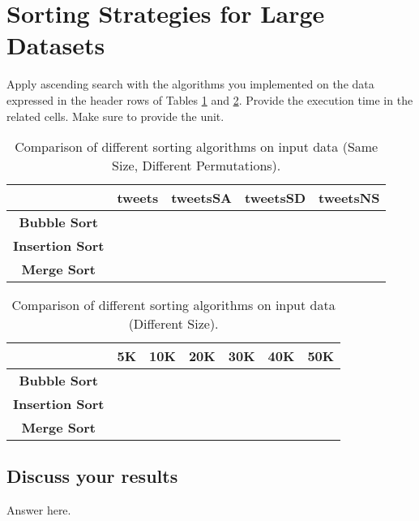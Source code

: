 \label{implementation}

\section{Sorting Strategies for Large Datasets}

Apply ascending search with the algorithms you implemented on the data expressed in the header rows of Tables \ref{dataPermutation} and \ref{dataSize}. Provide the execution time in the related cells. Make sure to provide the unit. 

\begin{table}[h!]
\centering
\begin{tabular}{|c|c|c|c|c|}
\hline
                        & \textbf{tweets} & \textbf{tweetsSA} & \textbf{tweetsSD} & \textbf{tweetsNS} \\ \hline
\textbf{Bubble Sort}   &                    & & &                    \\ \hline

\textbf{Insertion Sort}   &                    & & &                    \\ \hline
\textbf{Merge Sort}   &                    & & &                    \\ \hline

\end{tabular}
\caption{Comparison of different sorting algorithms on input data (Same Size, Different Permutations). }
\label{dataPermutation}
\end{table}

\begin{table}[h!]
\centering
\begin{tabular}{|c|c|c|c|c|c|c|}
\hline
                        & \textbf{5K} & \textbf{10K} & \textbf{20K} & \textbf{30K} & \textbf{40K} & \textbf{50K} \\ \hline
\textbf{Bubble Sort} & & & & & & \\ \hline
\textbf{Insertion Sort} & & & & & & \\ \hline
\textbf{Merge Sort} & & & & & & \\ \hline
\end{tabular}
\caption{Comparison of different sorting algorithms on input data (Different Size). }
\label{dataSize}
\end{table}

\subsection*{Discuss your results}
Answer here. 

